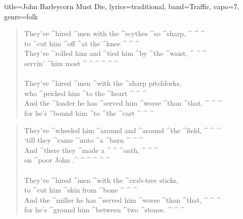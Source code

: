 \documentclass{article}
\begin{document}
\begin{song}{title={John Barleycorn Must Die}, lyrics={traditional}, band={Traffic}, capo={7}, genre={folk}}
\begin{verse}
	\end{verse}
	\begin{chorus*}
		       
	\end{chorus*}
	\begin{verse}
		They've ^hired ^men with the ^scythes ^so ^sharp, ^ {} ^ {} ^ {} \\
		to ^cut him ^off ^at the ^knee ^ {} ^ {} ^ {} \\
		They've ^rolled him and ^tied him ^by ^the ^waist, ^ {} ^ {} ^ {} \\
		servin' ^him most ^ {} ^ {} ^ {}^ {} ^ {} ^ {} \\
		\\
		They've ^hired ^men ^with the ^sharp pitchforks, \\
		who ^pricked him ^to the ^heart ^ {} ^ {} ^ {} \\
		And the ^loader he has ^served him ^worse ^than ^that, ^ {} ^ {} ^ {} \\
		for he's ^bound him ^to ^the ^cart ^ {} ^ {} ^ {} \\
	\end{verse}
	\begin{chorus*}
		       \times 4
	\end{chorus*}
	\begin{verse}
		They've ^wheeled him ^around and ^around ^the ^field, ^ {} ^ {} ^ {} \\
		‘till they ^came ^unto ^a ^barn ^ {} ^ {} ^ {} \\
		And ^there they ^made a ^ {}^ {}
		^oath, ^ {} ^ {} ^ {} \\
		on ^poor John .^ {}^ {}^ {}
		^ {} ^ {} ^ {} \\
		\\
		They've ^hired ^men ^with the ^crab-tree sticks, \\
		to ^cut him ^skin from ^bone ^ {} ^ {} ^ {} \\
		And the ^miller he has ^served him ^worse ^than ^that, ^ {} ^ {} ^ {} \\
		for he's ^ground him ^between ^two ^stones. ^ {} ^ {} ^ {} \\

\end{verse}
\end{song}
\end{document}
